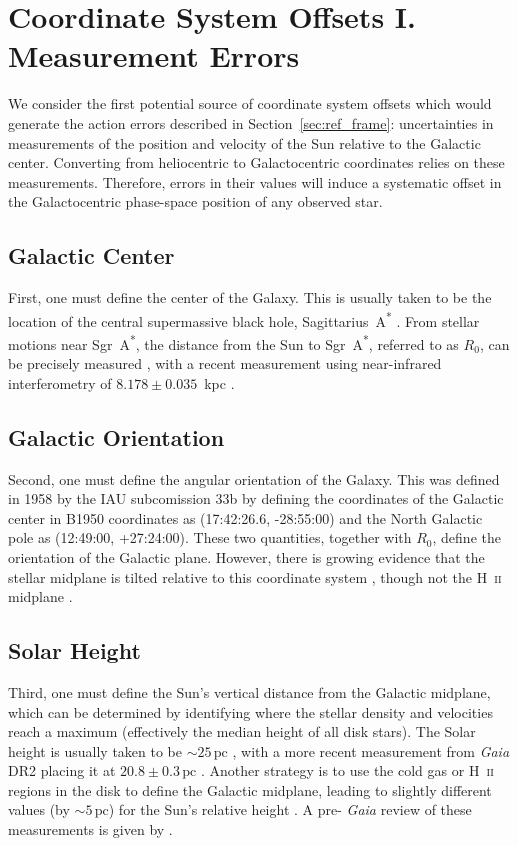 \documentclass[twocolumn]{aastex62}
\newcommand{\pc}{\text{pc}}
\newcommand{\sgra}{Sgr~A\textsuperscript{*}}
\begin{document}
\section{Coordinate System Offsets I. Measurement Errors} \label{sec:mes_err}
We consider the first potential source of coordinate system offsets which
would generate the action errors described in Section~\ref{sec:ref_frame}:
uncertainties in measurements of the position and velocity of the Sun relative
to the Galactic center. Converting from heliocentric to Galactocentric
coordinates relies on these measurements. Therefore, errors in their values
will induce a systematic offset in the Galactocentric phase-space position of
any observed star.

\subsection{Galactic Center}
First, one must define the center of the Galaxy. This is usually taken to be
the location of the central supermassive black hole, Sagittarius~A\textsuperscript{*}
\citep[\sgra{}, e.g.][]{2004ApJ...616..872R}. From stellar motions near
\sgra{}, the distance from the Sun to \sgra{}, referred to as $R_0$, can be
precisely measured \citep{2009ApJ...692.1075G, 2018AA...615L..15G}, with a
recent measurement using near-infrared interferometry of $8.178 \pm 0.035$~kpc
\citep{2019arXiv190405721A}.

\subsection{Galactic Orientation}
Second, one must define the angular orientation of the Galaxy. This was
defined in 1958 by the IAU subcomission 33b \citep{1960MNRAS.121..123B} by
defining the coordinates of the Galactic center in B1950 coordinates as
(17:42:26.6, -28:55:00) and the North Galactic pole as (12:49:00, +27:24:00).
These two quantities, together with $R_0$, define the orientation of the
Galactic plane. However, there is growing evidence that the stellar midplane
is tilted relative to this coordinate system \citep{2014ApJ...797...53G,
2016ARAA..54..529B}, though not the H~\textsc{ii} midplane
\citep{2019ApJ...871..145A}.

\subsection{Solar Height}
Third, one must define the Sun's vertical distance from the Galactic midplane,
which can be determined by identifying where the stellar density and
velocities reach a maximum (effectively the median height of all disk stars).
The Solar height is usually taken to be $\sim 25\,\pc$
\citep{2001ApJ...553..184C}, with a more recent measurement from \textit{Gaia}
DR2 placing it at $20.8 \pm 0.3\,\pc$ \citep{2019MNRAS.482.1417B}. Another
strategy is to use the cold gas or H~\textsc{ii} regions in the disk to define
the Galactic midplane, leading to slightly different values (by $\sim 5\,\pc$)
for the Sun's relative height \citep[e.g.][]{2019ApJ...871..145A}. A pre-{\em
Gaia} review of these measurements is given by \citet{2016ARAA..54..529B}.
\end{document}
